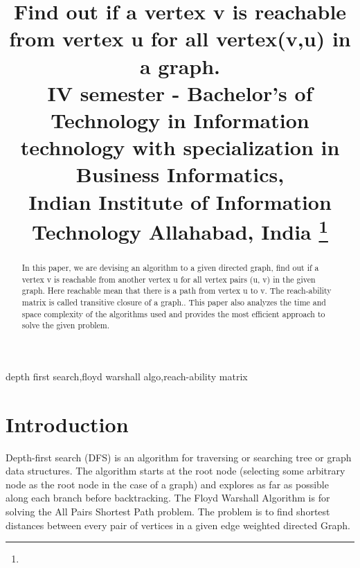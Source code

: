 \documentclass[conference]{IEEEtran}
\begin{document}
\title{Find out if a vertex v is reachable from vertex u for all vertex(v,u) in a graph.
\\
{\footnotesize {
IV semester - Bachelor’s of Technology in Information technology with specialization in Business Informatics,\\
Indian Institute of Information Technology Allahabad, India
}}
\thanks{}
}

\author{
\and
{}
\and
{}
}


\maketitle

\begin{abstract}
In this paper, we are devising an algorithm to a given directed graph, find out if a vertex v is reachable from another vertex u for all vertex pairs (u, v) in the given graph. Here reachable mean that there is a path from vertex u to v. The reach-ability matrix is called transitive closure of a graph.. This paper also analyzes the time and space complexity of the algorithms used and provides the most efficient approach to solve the given problem.
\end{abstract}
\bigskip
\begin{IEEEkeywords}
depth first search,floyd warshall algo,reach-ability matrix
\end{IEEEkeywords}

\section{Introduction}
Depth-first search (DFS) is an algorithm for traversing or searching tree or graph data structures. The algorithm starts at the root node (selecting some arbitrary node as the root node in the case of a graph) and explores as far as possible along each branch before backtracking.
The Floyd Warshall Algorithm is for solving the All Pairs Shortest Path problem. The problem is to find shortest distances between every pair of vertices in a given edge weighted directed Graph.
\end{document}
